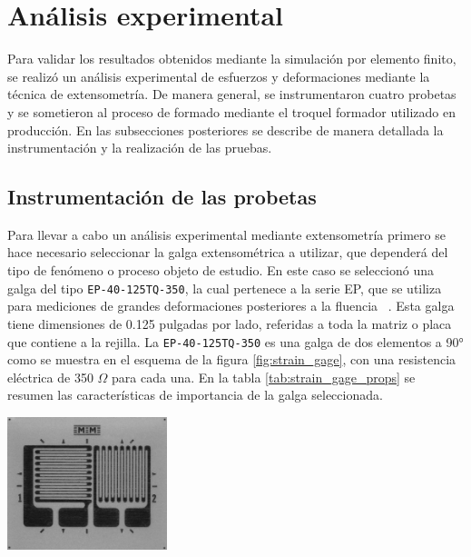 \section{Análisis experimental}

Para validar los resultados obtenidos mediante la simulación por elemento finito, se realizó 
un análisis experimental de esfuerzos y deformaciones mediante la técnica de extensometría. 
De manera general, se instrumentaron cuatro probetas y se sometieron al proceso de formado 
mediante el troquel formador utilizado en producción. En las subsecciones posteriores se describe 
de manera detallada la instrumentación y la realización de las pruebas.

\subsection{Instrumentación de las probetas}

Para llevar a cabo un análisis experimental mediante extensometría primero se hace necesario 
seleccionar la galga extensométrica a utilizar, que dependerá del tipo de fenómeno o proceso 
objeto de estudio. En este caso se seleccionó una galga del tipo \texttt{EP-40-125TQ-350}, la 
cual pertenece a la serie EP, que se utiliza para mediciones de grandes deformaciones posteriores 
a la fluencia ~\cite{vishay-catalog}. Esta galga tiene dimensiones de 0.125 pulgadas por lado, referidas a toda la 
matriz o placa que contiene a la rejilla. La \texttt{EP-40-125TQ-350} es una galga de dos 
elementos a 90° como se muestra en el esquema de la figura \ref{fig:strain_gage}, con 
una resistencia eléctrica de 350 $\Omega$ para cada una. En la tabla \ref{tab:strain_gage_props} 
se resumen las características de importancia de la galga seleccionada.

\begin{center}
\includegraphics[width=0.35\textwidth]{src/ch3/strain_gage.png}
\label{fig:strain_gage}
\end{center}

